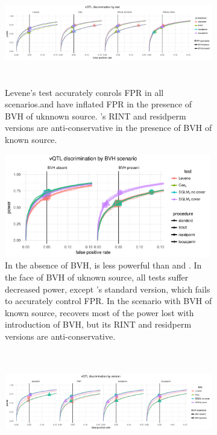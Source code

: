   \begin{figure}[ht]
      \begin{subfigure}{\textwidth}
          \centering
          \includegraphics[height = 4.5cm]{images/rocs_vqtl_all_facet_by_test.pdf}
          \caption{
          Levene's test accurately conrols FPR in all scenarios.\Caov and \DGLMv have inflated FPR in the presence of BVH of uknnown source.
          \DGLMv's RINT and residperm versions are anti-conservative in the presence of BVH of known source.}
      \vspace*{1cm}
      \end{subfigure}
      \begin{subfigure}{\textwidth}
          \centering
          \includegraphics[height = 4.5cm]{images/rocs_vqtl_all_facet_by_bvh.pdf}
          \caption{
          In the absence of BVH, \Lev is less powerful than \Caov and \DGLMv.
          In the face of BVH of uknown source, all tests suffer decreased power, except \DGLMv's standard version, which fails to accurately control FPR.
          In the scenario with BVH of known source, \DGLMv recovers most of the power lost with introduction of BVH, but its RINT and residperm versions are anti-conservative.
          }
      \vspace*{1cm}
      \end{subfigure}
      \begin{subfigure}{\textwidth}
          \centering
          \includegraphics[height = 4.5cm]{images/rocs_vqtl_all_facet_by_eval.pdf}

\end{subfigure}
\end{figure}
